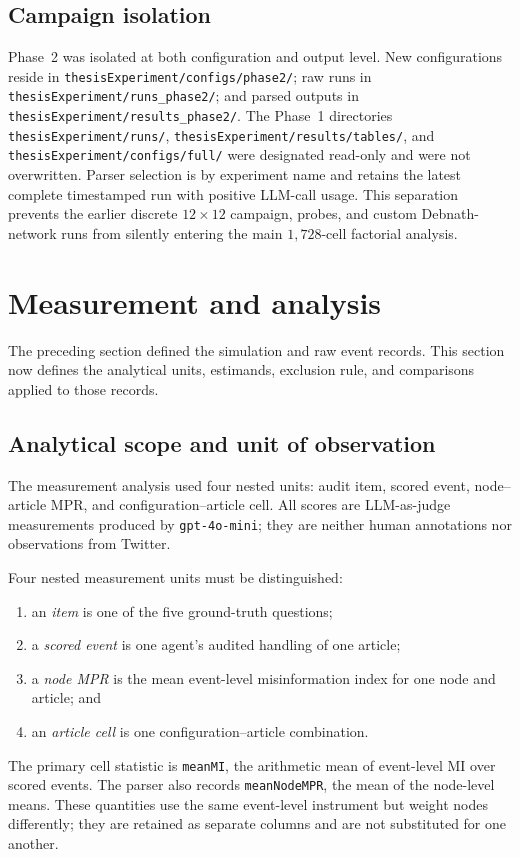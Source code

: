 \subsection{Campaign isolation}
\label{subsec:simulation-isolation}

Phase~2 was isolated at both configuration and output level.  New
configurations reside in
\texttt{thesisExperiment/configs/phase2/}; raw runs in
\texttt{thesisExperiment/runs\_phase2/}; and parsed outputs in
\texttt{thesisExperiment/results\_phase2/}.  The Phase~1 directories
\texttt{thesisExperiment/runs/},
\texttt{thesisExperiment/results/tables/}, and
\texttt{thesisExperiment/configs/full/} were designated read-only and were not
overwritten.  Parser selection is by experiment name and retains the latest
complete timestamped run with positive LLM-call usage.  This separation
prevents the earlier discrete \(12\times12\) campaign, probes, and custom
Debnath-network runs from silently entering the main \(1{,}728\)-cell
factorial analysis.


\section{Measurement and analysis}
\label{sec:methods-measurement}

The preceding section defined the simulation and raw event records. This
section now defines the analytical units, estimands, exclusion rule, and
comparisons applied to those records.

\subsection{Analytical scope and unit of observation}
\label{sec:mm-scope}

The measurement analysis used four nested units: audit item, scored event,
node--article MPR, and configuration--article cell. All scores are
LLM-as-judge measurements produced by \texttt{gpt-4o-mini}; they are neither
human annotations nor observations from Twitter.

Four nested measurement units must be distinguished:
\begin{enumerate}
  \item an \emph{item} is one of the five ground-truth questions;
  \item a \emph{scored event} is one agent's audited handling of one article;
  \item a \emph{node MPR} is the mean event-level misinformation index for one node and
        article; and
  \item an \emph{article cell} is one configuration--article combination.
\end{enumerate}
The primary cell statistic is \texttt{meanMI}, the arithmetic mean of event-level MI
over scored events.  The parser also records \texttt{meanNodeMPR}, the mean of the
node-level means.  These quantities use the same event-level instrument but weight
nodes differently; they are retained as separate columns and are not substituted for
one another.

